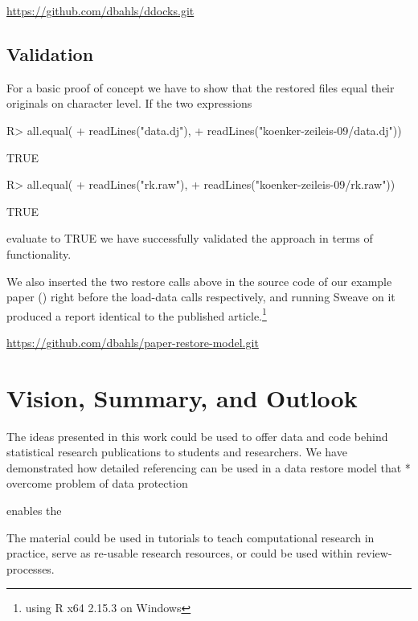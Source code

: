 \documentclass{acm_proc_article-sp}
\begin{document}
\url{https://github.com/dbahls/ddocks.git}

\subsection{Validation}

For a basic proof of concept we have to show that the restored files equal their originals on character level.
If the two expressions
\begin{Schunk}
\begin{Sinput}
R> all.equal(
+    readLines("data.dj"), 
+    readLines("koenker-zeileis-09/data.dj")) 
\end{Sinput}
\begin{Soutput}
[1] TRUE
\end{Soutput}
\begin{Sinput}
R> all.equal(
+    readLines("rk.raw"), 
+    readLines("koenker-zeileis-09/rk.raw")) 
\end{Sinput}
\begin{Soutput}
[1] TRUE
\end{Soutput}
\end{Schunk}
evaluate to TRUE we have successfully validated the approach in terms of functionality.

We also inserted the two restore calls above in the source code of our example paper (\cite{koenkerzeileis09}) right before the load-data calls respectively, and running Sweave on it produced a report identical to the published article.\footnote{using R x64 2.15.3 on Windows}
%
%

\url{https://github.com/dbahls/paper-restore-model.git}


\section{Vision, Summary, and Outlook}


The ideas presented in this work could be used to offer data and code behind statistical research publications to students and researchers.
We have demonstrated how detailed referencing can be used in a data restore model that 
 * overcome problem of data protection

enables the 


The material could be used in tutorials to teach computational research in practice, serve as re-usable research resources, or could be used within review-processes.
\end{document}
